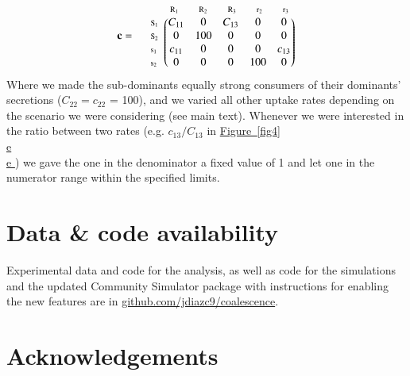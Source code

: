 \documentclass[a4paper,10pt]{article}
\newcommand{\figref}[2][]{%
  \hyperref[{#2}]{%
    Figure~\ref*{#2}%
    \ifx\\#1\\%
    \else
      #1%
    \fi
  }%
}
\begin{document}
\begin{equation*}
\mathbf{c} = \; \; \; \; \; \begin{matrix}
 & 

\begin{matrix}
\text{\scriptsize $\mathrm{R}_1$} \;\;\; & 
\text{\scriptsize $\mathrm{R}_2$} \;\;\; & 
\text{\scriptsize $\mathrm{R}_3$} \;\;\; & 
\text{\scriptsize $\mathrm{r}_2$} \;\;\; & 
\text{\scriptsize $\mathrm{r}_3$}
\end{matrix}

\\ 

\begin{matrix*}[l]
\text{\scriptsize $\mathrm{S}_1$} \!\!\! \\
\text{\scriptsize $\mathrm{S}_2$} \!\!\! \\
\text{\scriptsize $\mathrm{s}_1$} \!\!\! \\
\text{\scriptsize $\mathrm{s}_2$} \!\!\!
\end{matrix*}

& 

\begin{pmatrix}
C_{11} & 0 & C_{13} & 0 & 0 \\
0 & 100 & 0 & 0 & 0 \\
c_{11} & 0 & 0 & 0 & c_{13} \\
0 & 0 & 0 & 100 & 0
\end{pmatrix}

\end{matrix}
\end{equation*}
%
Where we made the sub-dominants equally strong consumers of their dominants' secretions
($C_{22} = c_{22}$ = 100),
and we varied all other uptake rates depending on the scenario we were considering (see main text).
Whenever we were interested in the ratio between two rates (e.g. $c_{13}/C_{13}$ in \figref[e]{fig4})
we gave the one in the denominator a fixed value of 1 and let one in the numerator range
within the specified limits.

\section*{Data \& code availability}\label{datacode}

Experimental data and code for the analysis, as well as code for the simulations
and the updated Community Simulator package with instructions for enabling the
new features are in \url{github.com/jdiazc9/coalescence}.

\section*{Acknowledgements}
\end{document}
